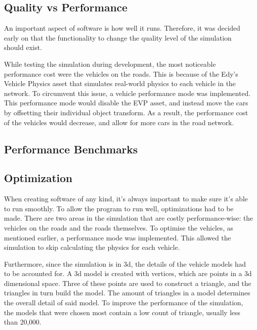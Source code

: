 \subsection{Quality vs Performance}
    An important aspect of software is how well it runs. Therefore, it was decided early on that the functionality to change the quality level of the simulation should exist. 

    While testing the simulation during development, the most noticeable performance cost were the vehicles on the roads. This is because of the Edy's Vehicle Physics asset that simulates real-world physics to each vehicle in the network. To circumvent this issue, a vehicle performance mode was implemented. This performance mode would disable the EVP asset, and instead move the cars by offsetting their individual object transform. As a result, the performance cost of the vehicles would decrease, and allow for more cars in the road network.




\subsection{Performance Benchmarks}

\subsection{Optimization} 
    When creating software of any kind, it's always important to make sure it's able to run smoothly. To allow the program to run well, optimizations had to be made. There are two areas in the simulation that are costly performance-wise: the vehicles on the roads and the roads themselves. To optimise the vehicles, as mentioned earlier, a performance mode was implemented. This allowed the simulation to skip calculating the physics for each vehicle. 

    Furthermore, since the simulation is in 3d, the details of the vehicle models had to be accounted for. A 3d model is created with vertices, which are points in a 3d dimensional space. Three of these points are used to construct a triangle, and the triangles in turn build the model. The amount of triangles in a model determines the overall detail of said model. To improve the performance of the simulation, the models that were chosen most contain a low count of triangle, usually less than 20,000. 


